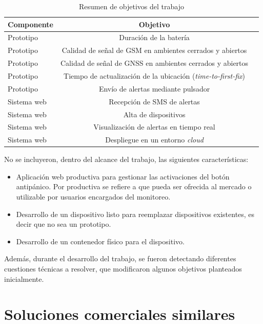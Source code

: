 \begin{table}[h]
	\centering
	\caption[Resumen de objetivos]{Resumen de objetivos del trabajo}
	\begin{tabular}{l c c}    
		\toprule
		\textbf{Componente} 	 & \textbf{Objetivo} 	  \\
		\midrule
		Prototipo & Duración de la batería 				\\		
		Prototipo & Calidad de señal de GSM en ambientes cerrados y abiertos			\\
		Prototipo & Calidad de señal de GNSS en ambientes cerrados y abiertos			\\
		Prototipo & Tiempo de actualización de la ubicación (\textit{time-to-first-fix}) \\
		Prototipo & Envío de alertas mediante pulsador		\\
		Sistema web & Recepción de SMS de alertas			\\
		Sistema web & Alta de dispositivos			\\
		Sistema web & Visualización de alertas en tiempo real			\\
		Sistema web & Despliegue en un entorno \textit{cloud}			\\
		\bottomrule
		\hline
	\end{tabular}
	\label{tab:peces}
\end{table}

No se incluyeron, dentro del alcance del trabajo, las siguientes características:

\begin{itemize}
\item Aplicación web productiva para gestionar las activaciones del botón antipánico. Por productiva se refiere a que pueda ser ofrecida al mercado o utilizable por usuarios encargados del monitoreo.
\item Desarrollo de un dispositivo listo para reemplazar dispositivos existentes, es decir que no sea un prototipo.
\item Desarrollo de un contenedor físico para el dispositivo.
\end{itemize}

Además, durante el desarrollo del trabajo, se fueron detectando diferentes cuestiones técnicas a resolver, que modificaron algunos objetivos planteados inicialmente.


\section{Soluciones comerciales similares}


